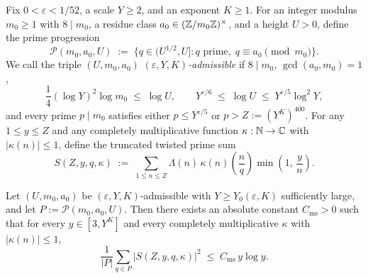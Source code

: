 Fix $0 < \varepsilon < 1/52$, a scale $Y \ge 2$, and an exponent $K \ge 1$. For an integer modulus $m_0 \ge 1$ with $8 \mid m_0$, a residue class $a_0 \in (\mathbb{Z}/m_0\mathbb{Z})^\times$, and a height $U > 0$, define the prime progression
\[
  \mathcal{P}(m_0, a_0, U) \;:=\; \bigl\{q \in (U^{1/2}, U] : q \text{ prime},\; q \equiv a_0 \pmod{m_0}\bigr\}.
\]
We call the triple $(U, m_0, a_0)$ \emph{$(\varepsilon, Y, K)$-admissible} if $8 \mid m_0$, $\gcd(a_0, m_0) = 1$,
\begin{equation}
\label{eq:04:admissible-triple}
  \frac{1}{4}(\log Y)^2 \log m_0 \;\le\; \log U, \qquad
  Y^{\varepsilon/6} \;\le\; \log U \;\le\; Y^{\varepsilon/5}\log^2 Y,
\end{equation}
and every prime $p \mid m_0$ satisfies either $p \le Y^{\varepsilon/5}$ or $p > Z := (Y^K)^{400}$. For any $1 \le y \le Z$ and any completely multiplicative function $\kappa : \mathbb{N} \to \mathbb{C}$ with $|\kappa(n)| \le 1$, define the truncated twisted prime sum
\begin{equation}
\label{eq:04:S-sum}
  S(Z, y, q, \kappa) \;:=\; \sum_{1 \le n \le Z} \Lambda(n)\,\kappa(n)\!\left(\frac{n}{q}\right)\min\!\left(1,\, \frac{y}{n}\right).
\end{equation}

\begin{proposition}
\label{prop:04:msq-pairs}
Let $(U, m_0, a_0)$ be $(\varepsilon, Y, K)$-admissible with $Y \ge Y_0(\varepsilon, K)$ sufficiently large, and let $P := \mathcal{P}(m_0, a_0, U)$. Then there exists an absolute constant $C_{\mathrm{ms}} > 0$ such that for every $y \in [3, Y^K]$ and every completely multiplicative $\kappa$ with $|\kappa(n)| \le 1$,
\begin{equation}
\label{eq:04:msq-bound}
  \frac{1}{|P|}\sum_{q \in P} \bigl|S(Z, y, q, \kappa)\bigr|^2 \;\le\; C_{\mathrm{ms}}\, y \log y.
\end{equation}
\end{proposition}

